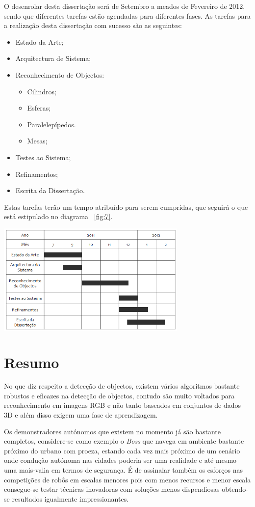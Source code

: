 O desenrolar desta dissertação será de Setembro a meados de Fevereiro de 2012, sendo
que diferentes tarefas estão agendadas para diferentes fases. As tarefas para a realização
desta dissertação com sucesso são as seguintes:
\begin{itemize}
\item Estado da Arte;
\item Arquitectura de Sistema;
\item Reconhecimento de Objectos:
\begin{itemize}
\item Cilindros;
\item Esferas;
\item Paralelepípedos.
\item Mesas;
\end{itemize}
\item Testes ao Sistema;
\item Refinamentos;
\item Escrita da Dissertação.
\end{itemize}

Estas tarefas terão um tempo atribuído para serem cumpridas, que seguirá o que está estipulado no
diagrama ~\ref{fig:7}.

\begin{center}
	\includegraphics[width=0.70\textwidth]{figures/diss_timetable.PNG}
	\label{fig:7}
\end{center}

\section{Resumo}

No que diz respeito a detecção de objectos, existem vários algoritmos bastante robustos e
eficazes na detecção de objectos, contudo são muito voltados para reconhecimento em imagens RGB
e não tanto baseados em conjuntos de dados 3D e além disso exigem uma fase de aprendizagem.

Os demonstradores autónomos que existem no momento já são bastante completos, considere-se
como exemplo o \emph{Boss} que navega em ambiente bastante próximo do urbano com proeza,
estando cada vez mais próximo de um cenário onde condução autónoma nas cidades poderia ser
uma realidade e até mesmo uma mais-valia em termos de segurança. É de assinalar também os esforços
nas competições de robôs em escalas menores pois com menos recursos e menor escala consegue-se
testar técnicas inovadoras com soluções menos dispendiosas obtendo-se resultados igualmente
impressionantes.

